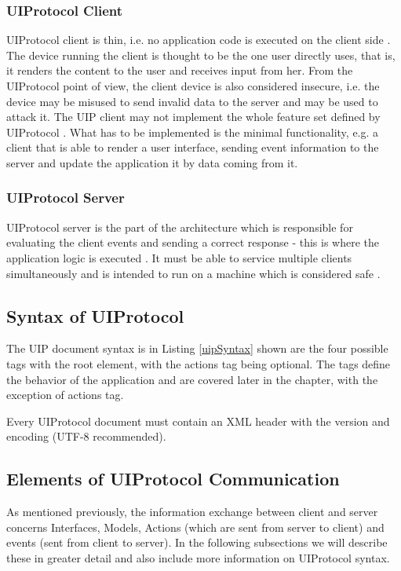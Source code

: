 \subsubsection{UIProtocol Client}
UIProtocol client is thin, i.e. no application code is executed on the client side \cite{uip}. The device running the client is thought to be the one user directly uses, that is, it renders the content to the user and receives input from her. From the UIProtocol point of view, the client device is also considered insecure, i.e. the device may be misused to send invalid data to the server and may be used to attack it. The UIP client may not implement the whole feature set defined by UIProtocol \cite{uip}. What has to be implemented is the minimal functionality, e.g. a client that is able to render a user interface, sending event information to the server and update the application it by data coming from it.

\subsubsection{UIProtocol Server}
UIProtocol server is the part of the architecture which is responsible for evaluating the client events and sending a correct response - this is where the application logic is executed \cite{uip}. It must be able to service multiple clients simultaneously and is intended to run on a machine which is considered safe \cite{uip}.

\subsection{Syntax of UIProtocol}
The UIP document syntax is in Listing \ref{uipSyntax} shown are the four possible tags with the root element, with the actions tag being optional. The tags define the behavior of the application and are covered later in the chapter, with the exception of actions tag.



Every UIProtocol document must contain an XML header with the version and encoding (UTF-8 recommended).

\subsection{Elements of UIProtocol Communication}
As mentioned previously, the information exchange between client and server concerns Interfaces, Models, Actions (which are sent from server to client) and events (sent from client to server). In the following subsections we will describe these in greater detail and also include more information on UIProtocol syntax.

